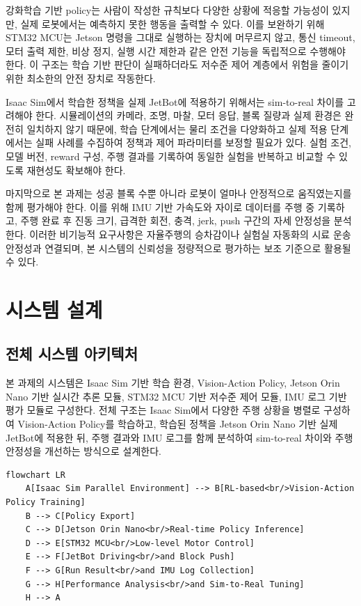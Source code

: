 \documentclass[titlepage]{pnureport}
\begin{document}
강화학습 기반 policy는 사람이 작성한 규칙보다 다양한 상황에 적응할 가능성이 있지만, 실제 로봇에서는 예측하지 못한 행동을 출력할 수 있다. 이를 보완하기 위해 STM32 MCU는 Jetson 명령을 그대로 실행하는 장치에 머무르지 않고, 통신 timeout, 모터 출력 제한, 비상 정지, 실행 시간 제한과 같은 안전 기능을 독립적으로 수행해야 한다. 이 구조는 학습 기반 판단이 실패하더라도 저수준 제어 계층에서 위험을 줄이기 위한 최소한의 안전 장치로 작동한다.

Isaac Sim에서 학습한 정책을 실제 JetBot에 적용하기 위해서는 sim-to-real 차이를 고려해야 한다. 시뮬레이션의 카메라, 조명, 마찰, 모터 응답, 블록 질량과 실제 환경은 완전히 일치하지 않기 때문에, 학습 단계에서는 물리 조건을 다양화하고 실제 적용 단계에서는 실패 사례를 수집하여 정책과 제어 파라미터를 보정할 필요가 있다. 실험 조건, 모델 버전, reward 구성, 주행 결과를 기록하여 동일한 실험을 반복하고 비교할 수 있도록 재현성도 확보해야 한다.

마지막으로 본 과제는 성공 블록 수뿐 아니라 로봇이 얼마나 안정적으로 움직였는지를 함께 평가해야 한다. 이를 위해 IMU 기반 가속도와 자이로 데이터를 주행 중 기록하고, 주행 완료 후 진동 크기, 급격한 회전, 충격, jerk, push 구간의 자세 안정성을 분석한다. 이러한 비기능적 요구사항은 자율주행의 승차감이나 실험실 자동화의 시료 운송 안정성과 연결되며, 본 시스템의 신뢰성을 정량적으로 평가하는 보조 기준으로 활용될 수 있다.

\chapter{시스템 설계}

\section{전체 시스템 아키텍처}

본 과제의 시스템은 Isaac Sim 기반 학습 환경, Vision-Action Policy, Jetson Orin Nano 기반 실시간 추론 모듈, STM32 MCU 기반 저수준 제어 모듈, IMU 로그 기반 평가 모듈로 구성한다. 전체 구조는 Isaac Sim에서 다양한 주행 상황을 병렬로 구성하여 Vision-Action Policy를 학습하고, 학습된 정책을 Jetson Orin Nano 기반 실제 JetBot에 적용한 뒤, 주행 결과와 IMU 로그를 함께 분석하여 sim-to-real 차이와 주행 안정성을 개선하는 방식으로 설계한다.

\begin{lstlisting}[language=mermaid,caption={전체 시스템 아키텍처 Mermaid 표현}]
flowchart LR
    A[Isaac Sim Parallel Environment] --> B[RL-based<br/>Vision-Action Policy Training]
    B --> C[Policy Export]
    C --> D[Jetson Orin Nano<br/>Real-time Policy Inference]
    D --> E[STM32 MCU<br/>Low-level Motor Control]
    E --> F[JetBot Driving<br/>and Block Push]
    F --> G[Run Result<br/>and IMU Log Collection]
    G --> H[Performance Analysis<br/>and Sim-to-Real Tuning]
    H --> A
\end{lstlisting}
\end{document}

